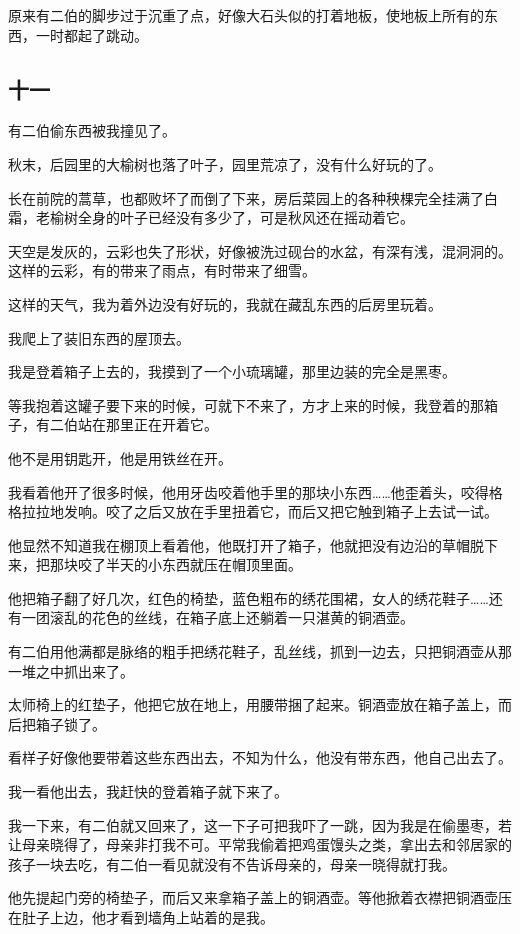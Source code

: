 \documentclass[UTF8]{ctexart}
\begin{document}
原来有二伯的脚步过于沉重了点，好像大石头似的打着地板，使地板上所有的东西，一时都起了跳动。

\subsection{十一}

有二伯偷东西被我撞见了。

秋末，后园里的大榆树也落了叶子，园里荒凉了，没有什么好玩的了。

长在前院的蒿草，也都败坏了而倒了下来，房后菜园上的各种秧棵完全挂满了白霜，老榆树全身的叶子已经没有多少了，可是秋风还在摇动着它。

天空是发灰的，云彩也失了形状，好像被洗过砚台的水盆，有深有浅，混洞洞的。这样的云彩，有的带来了雨点，有时带来了细雪。

这样的天气，我为着外边没有好玩的，我就在藏乱东西的后房里玩着。

我爬上了装旧东西的屋顶去。

我是登着箱子上去的，我摸到了一个小琉璃罐，那里边装的完全是黑枣。

等我抱着这罐子要下来的时候，可就下不来了，方才上来的时候，我登着的那箱子，有二伯站在那里正在开着它。

他不是用钥匙开，他是用铁丝在开。

我看着他开了很多时候，他用牙齿咬着他手里的那块小东西……他歪着头，咬得格格拉拉地发响。咬了之后又放在手里扭着它，而后又把它触到箱子上去试一试。

他显然不知道我在棚顶上看着他，他既打开了箱子，他就把没有边沿的草帽脱下来，把那块咬了半天的小东西就压在帽顶里面。

他把箱子翻了好几次，红色的椅垫，蓝色粗布的绣花围裙，女人的绣花鞋子……还有一团滚乱的花色的丝线，在箱子底上还躺着一只湛黄的铜酒壶。

有二伯用他满都是脉络的粗手把绣花鞋子，乱丝线，抓到一边去，只把铜酒壶从那一堆之中抓出来了。

太师椅上的红垫子，他把它放在地上，用腰带捆了起来。铜酒壶放在箱子盖上，而后把箱子锁了。

看样子好像他要带着这些东西出去，不知为什么，他没有带东西，他自己出去了。

我一看他出去，我赶快的登着箱子就下来了。

我一下来，有二伯就又回来了，这一下子可把我吓了一跳，因为我是在偷墨枣，若让母亲晓得了，母亲非打我不可。平常我偷着把鸡蛋馒头之类，拿出去和邻居家的孩子一块去吃，有二伯一看见就没有不告诉母亲的，母亲一晓得就打我。

他先提起门旁的椅垫子，而后又来拿箱子盖上的铜酒壶。等他掀着衣襟把铜酒壶压在肚子上边，他才看到墙角上站着的是我。
\end{document}

